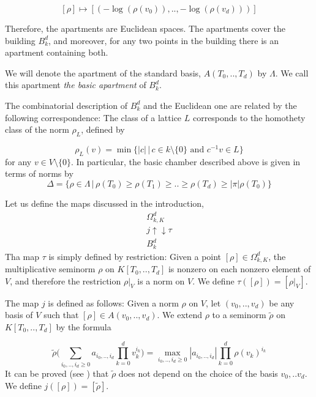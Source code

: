\documentclass{amsart}
\theoremstyle{theorem}
\theoremstyle{lemma}
\theoremstyle{prop}
\theoremstyle{definition}
\theoremstyle{corollary}
\theoremstyle{remark}
\begin{document}
$$[\rho]\mapsto [(-\log (\rho(v_0)), .., -\log(\rho(v_d)))]$$

Therefore, the apartments are Euclidean spaces. The apartments cover the building $B^d_k$, and moreover, for any two points in the building there is an apartment containing 
both. 

We will denote the apartment of the standard basis, $A(T_0,..,T_d)$ by $\Lambda$. We call this apartment \emph {the basic apartment} of $B^d_k$.

The combinatorial description of $B^d_k$ and the Euclidean one are related by the following correspondence:  The class of a lattice $L$ corresponds to the homothety class of the norm $\rho_L$, defined by

\begin{equation}
\label{norm_formula}
\rho_L(v)=\min \{ |c| \, | \, c\in k \setminus \{0\}\text{ and } c^{-1}v \in L \}
\end{equation}
for any $v \in V \setminus\{0\}$. In particular, the basic chamber described above is given in terms of norms by $$ \Delta = \{\rho \in \Lambda \, | \, \rho(T_0) \geq \rho(T_1) \geq .. \geq \rho(T_d) \geq |\pi|\rho(T_0) \} $$

Let us define the maps discussed in the introduction,
\[ \begin{array}{c}
\Omega^d_{k,K} \\
j\uparrow \downarrow \tau \\
B^d_k
\end{array}\]
Tha map $\tau$ is simply defined by restriction: Given a point $[\rho]\in \Omega^d_{k,K}$, the multiplicative seminorm $\rho$ on $K[T_0,..,T_d]$ is nonzero on each nonzero element of $V$, and therefore the restriction $\rho |_V$ is a norm on $V$. We define $\tau([\rho])=[\rho|_V]$.

The map $j$ is defined as follows: Given a norm $\rho$ on $V$, let $(v_0,..,v_d)$ be any basis of $V$ such that $[\rho] \in A(v_0,..,v_d)$. We extend $\rho$ to a seminorm $\tilde{\rho}$ on $K[T_0,..,T_d]$ by the formula 

\begin{equation}
\label{embedformula}
 \tilde{\rho}\Big ( \sum_{i_0,..,i_d\geq 0}{ a_{i_0,..,i_d} \prod_{k=0}^d{v_k^{i_k}}}\Big ) = \max_{i_0,..,i_d\geq 0} {|a_{i_0,..,i_d}| \prod_{k=0}^d{\rho(v_k)^{i_k}}}
\end{equation}
It can be proved (see \cite{rtw}) that $\tilde{\rho}$ does not depend on the choice of the basis $v_0,..v_d$. We define $j([\rho])=[\tilde{\rho}]$.
\end{document}
